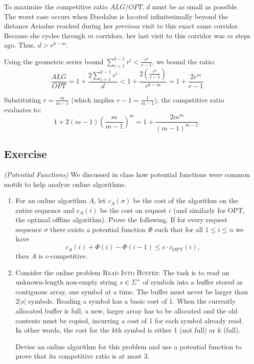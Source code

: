 \documentclass[14pt]{extreport}
\newcounter{counter}
\newcommand{\Exercise}{Exercise \stepcounter{counter}\thecounter}
\begin{document}
    \vspace{2mm}
    To maximize the competitive ratio $ALG/OPT$, $d$ must be as small as possible. The worst case occurs when Daedalus is located infinitesimally beyond the distance Ariadne reached during her \textit{previous} visit to this exact same corridor. Because she cycles through $m$ corridors, her last visit to this corridor was $m$ steps ago. Thus, $d > r^{k-m}$. 

    \vspace{2mm}
    Using the geometric series bound $\sum_{i=1}^{k-1} r^i < \frac{r^k}{r-1}$, we bound the ratio:
    $$\frac{ALG}{OPT} = 1 + \frac{2\sum_{i=1}^{k-1} r^i}{d} < 1 + \frac{2 \left(\frac{r^k}{r-1}\right)}{r^{k-m}} = 1 + \frac{2r^m}{r-1}$$

    \vspace{2mm}
    Substituting $r = \frac{m}{m-1}$ (which implies $r-1 = \frac{1}{m-1}$), the competitive ratio evaluates to:
    $$1 + 2(m-1)\left(\frac{m}{m-1}\right)^m = 1 + \frac{2m^m}{(m-1)^{m-1}}.$$

\subsection*{\Exercise}
    \textit{(Potential Functions)} We discussed in class how potential functions were common motifs to help analyze online algorithms.
    
    \begin{enumerate}[label=(\alph*)]
        \item For an online algorithm $A$, let $c_A(\sigma)$ be the cost of the algorithm on the entire sequence and $c_A(i)$ be the cost on request $i$ (and similarly for $\text{OPT}$, the optimal offline algorithm). Prove the following. If for every request sequence $\sigma$ there exists a potential function $\Phi$ such that for all $1 \leq i \leq n$ we have
        $$c_A(i) + \Phi(i) - \Phi(i-1) \leq c \cdot c_{\text{OPT}}(i),$$ then $A$ is $c$-competitive.
        
        \item Consider the online problem \textsc{Read Into Buffer}: The task is to read an unknown-length non-empty string $s \in \Sigma^+$ of symbols into a buffer stored as contiguous array, one symbol at a time. The buffer must never be larger than $2|s|$ symbols. Reading a symbol has a basic cost of 1. When the currently allocated buffer is full, a new, larger array has to be allocated and the old contents must be copied, incurring a cost of 1 for each symbol already read. In other words, the cost for the $k$th symbol is either 1 (not full) or $k$ (full).
    
        \vspace{5mm}
        Devise an online algorithm for this problem and use a potential function to prove that its competitive ratio is at most 3.
    \end{enumerate}
\end{document}

